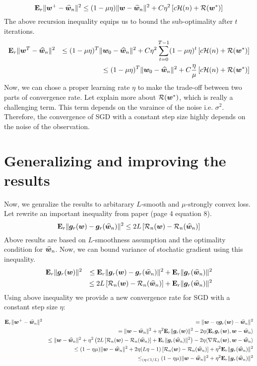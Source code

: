 \documentclass{article}
\begin{document}
\begin{equation*}
	\mathbf{E}_r \| \bm{w}^+ - \widehat{\bm{w}}_n\|^2 \leq (1-\mu \eta) \| \bm{w} - \widehat{\bm{w}}_n \|^2 + C \eta^2 \left[c
	{\cal H}(n) + {\cal R}(\bm{w}^*)\right]
\end{equation*}
The above recursion inequality equips us to bound the sub-optimality after $t$
iterations. 
\begin{eqnarray*}
	& \mathbf{E}_r \| \bm{w}^T - \widehat{\bm{w}}_n\|^2 & \leq (1-\mu \eta)^T \| \bm{w}_0 - \widehat{\bm{w}}_n \|^2 + C \eta^2
	\sum_{t=0}^{T-1} (1-\mu \eta)^{t} \left[c
	{\cal H}(n) + {\cal R}(\bm{w}^*)\right] \\ 
	& & \leq  (1-\mu \eta)^T \| \bm{w}_0 - \widehat{\bm{w}}_n \|^2 + C \frac{\eta}{\mu}
	 \left[c
	{\cal H}(n) + {\cal R}(\bm{w}^*)\right]
\end{eqnarray*}
Now, we can chose a proper learning rate $\eta$ to make the trade-off between
two parts of convergence rate. 
Let explain more about ${\cal R}(\bm{w}^*)$, which is really a challenging term. This
term depends on the varaince of the noise i.e. $\sigma^2$. Therefore, the
convergence of SGD with a constant step size highly depends on the noise of the
observation. 
\section{Generalizing and improving the results}
Now, we genralize the results to arbitarary $L$-smooth and $\mu$-strongly
convex loss. Let rewrite an important inequality from paper
\cite{johnson2013accelerating}(page 4 equation 8). 
\begin{equation*}
	\mathbf{E}_r \|  \bm{g}_r(\bm{w}) - \bm{g}_r(\widehat{\bm{w}}_n) \|^2 \leq 2 L \left[{\cal R}_n(\bm{w}) -
	{\cal R}_n(\widehat{\bm{w}}_n) \right]
\end{equation*}
Above results are based on $L$-smoothness assumption and the optimality
condition for $\widehat{\bm{w}}_n$. Now, we can bound variance of stochatic gradient using
this inequality. 
\begin{eqnarray*}
	& \mathbf{E}_r \| \bm{g}_r(\bm{w}) \|^2 & \leq \mathbf{E}_r \| \bm{g}_r(\bm{w}) - \bm{g}_r(\widehat{\bm{w}}_n)\|^2 + \mathbf{E}_r \|
	\bm{g}_r(\widehat{\bm{w}}_n) \|^2 \\ 
	& &  \leq 2 L \left[{\cal R}_n(\bm{w}) -
	{\cal R}_n(\widehat{\bm{w}}_n) \right] + \mathbf{E}_r \|
	\bm{g}_r(\widehat{\bm{w}}_n) \|^2
\end{eqnarray*}
Using above inequality we provide a new convergence rate for SGD with a constant
step size $\eta$: 

\begin{eqnarray*}
	&  \mathbf{E}_r \| \bm{w}^+ - \widehat{\bm{w}}_n\|^2 & = \|\bm{w} - \eta \bm{g}_r(\bm{w}) - \widehat{\bm{w}}_n \|^2 \\
	& & = \| \bm{w} - \widehat{\bm{w}}_n \|^2 + \eta^2 \mathbf{E}_r \| \bm{g}_r(\bm{w}) \|^2 - 2 \eta \langle
	\mathbf{E}_r \bm{g}_r(\bm{w}), \bm{w} - \widehat{\bm{w}}_n \rangle \\ 
	& & \leq \| \bm{w} - \widehat{\bm{w}}_n \|^2 + \eta^2 \left( 2 L
	\left[{\cal R}_n(\bm{w}) - {\cal R}_n(\widehat{\bm{w}}_n) \right] + \mathbf{E}_r \|
	\bm{g}_r(\widehat{\bm{w}}_n) \|^2 \right) - 2 \eta \langle
	\nabla {\cal R}_n(\bm{w}), \bm{w} - \widehat{\bm{w}}_n \rangle \\ 
	& & \leq 
	(1-\eta \mu) \|\bm{w}  - \widehat{\bm{w}}_n \|^2 + 2\eta(L\eta - 1) \left[
	{\cal R}_n(\bm{w}) - {\cal R}_n(\widehat{\bm{w}}_n) \right] + \eta^2 \mathbf{E}_r\| \bm{g}_r(\widehat{\bm{w}}_n) \|^2 \\
	& & \leq_{(\eta<1/L)}(1-\eta \mu) \|\bm{w}  - \widehat{\bm{w}}_n \|^2 + \eta^2 \mathbf{E}_r\| \bm{g}_r(\widehat{\bm{w}}_n)
	\|^2
\end{eqnarray*}




\end{document}

